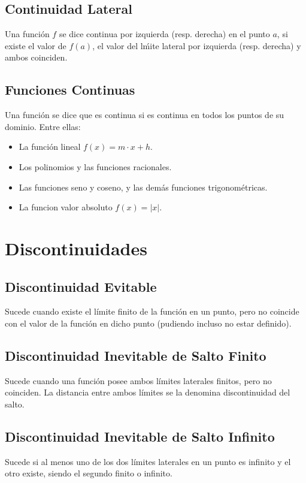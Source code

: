 \documentclass[11pt,a4paper]{article}
\begin{document}
\subsection{Continuidad Lateral}
Una funci\'on $f$ se dice continua por izquierda (resp. derecha) en el punto $a$, si existe el valor de $f(a)$, el valor del l\'mite lateral por izquierda (resp. derecha) y ambos coinciden.
\subsection{Funciones Continuas}
Una funci\'on se dice que es continua si es continua en todos los puntos de su dominio. Entre ellas:
\begin{itemize}
\item La funci\'on lineal $f(x)=m\cdot x + h$.
\item Los polinomios y las funciones racionales.
\item Las funciones seno y coseno, y las dem\'as funciones trigonom\'etricas.
\item La funcion valor absoluto $f(x)=|x|$.
\end{itemize}

\section{Discontinuidades}
\subsection{Discontinuidad Evitable}
Sucede cuando existe el l\'imite finito de la funci\'on en un punto, pero no coincide con el valor de la funci\'on en dicho punto (pudiendo incluso no estar definido).
\subsection{Discontinuidad Inevitable de Salto Finito}
Sucede cuando una funci\'on posee ambos l\'imites laterales finitos, pero no coinciden. La distancia entre ambos l\'imites se la denomina discontinuidad del salto.
\subsection{Discontinuidad Inevitable de Salto Infinito}
Sucede si al menos uno de los dos l\'imites laterales en un punto es infinito y el otro existe, siendo el segundo finito o infinito.
\end{document}

